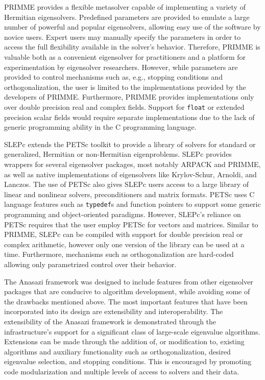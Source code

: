 \documentclass[acmtoms]{acmtrans2m}
\newcounter{algorithm}
\begin{document}
PRIMME provides a flexible metasolver capable of implementing a variety of
Hermitian eigensolvers. Predefined parameters are provided to emulate a large number of powerful 
and popular eigensolvers, allowing easy use of the software by novice users. Expert users may
manually specify the parameters in order to access the full flexibility available in the
solver's behavior. Therefore, PRIMME is valuable both as a convenient eigensolver for
practitioners and a platform for experimentation by eigensolver researchers. However,
while parameters are provided to control mechanisms such as, e.g., stopping conditions and
orthogonalization, the user is limited to the implementations provided by the developers of
PRIMME.  Furthermore, PRIMME provides implementations only over double precision real and complex
fields.  Support for \texttt{float} or extended precision scalar fields would require separate
implementations due to the lack of generic programming ability in the C programming
language.

SLEPc extends the PETSc toolkit to provide a library of solvers for standard or
generalized, Hermitian or non-Hermitian eigenproblems.
SLEPc provides wrappers for several eigensolver packages, most notably ARPACK and PRIMME,
as well as native implementations of eigensolvers like Krylov-Schur, Arnoldi, and Lanczos.
The use of PETSc also gives SLEPc users access to a large library of linear and nonlinear 
solvers, preconditioners and matrix formats. PETSc uses C language features such as 
\texttt{typedef}s and function pointers to support some generic programming and object-oriented 
paradigms. However, SLEPc's reliance on PETSc requires that the user employ PETSc for vectors 
and matrices. Similar to PRIMME, SLEPc can be compiled with support for double precision
real or complex arithmetic, however only one version of the library can be used at a time.
Furthermore, mechanisms such as orthogonalization are hard-coded allowing only parametrized 
control over their behavior. 

The Anasazi framework was designed to include features from other eigensolver packages
that are conducive to algorithm development, while avoiding some of the drawbacks
mentioned above.  The most important features that have been incorporated into its design
are extensibility and interoperability.  The extensibility of the Anasazi framework is
demonstrated through the infrastructure's support for a significant class of large-scale
eigenvalue algorithms.  Extensions can be made through the addition of, or modification
to, existing algorithms and auxiliary functionality such as orthogonalization, desired
eigenvalue selection, and stopping conditions.  This is encouraged by promoting code
modularization and multiple levels of access to solvers and their data. 
\end{document}
